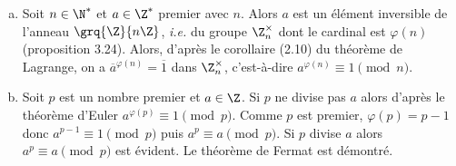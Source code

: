 \begin{enumerate}[a)]
  \item Soit $n\in\N^*$ et $a\in\Z^*$ premier avec $n$. Alors $a$ est un élément inversible de l'anneau $\grq{\Z}{n\Z}$, \textit{i.e.} du groupe $\Z^\times_n$ dont le cardinal est $\varphi(n)$ (proposition 3.24). Alors, d'après le corollaire (2.10) du théorème de Lagrange, on a $\overline{a}^{\varphi(n)}=\overline{1}$
    dans $\Z^\times_n$, c'est-à-dire $a^{\varphi(n)}\equiv 1\pmod{n}$.
  
  \item Soit $p$ est un nombre premier et $a\in\Z$. Si $p$ ne divise pas $a$
    alors d'après le théorème d'Euler $a^{\varphi(p)}\equiv 1\pmod{p}$.  Comme
    $p$ est premier, $\varphi(p)=p-1$ donc $a^{p-1}\equiv 1\pmod{p}$ puis
    $a^p\equiv a\pmod{p}$. Si $p$ divise $a$ alors $a^p\equiv a\pmod{p}$ est
    évident. Le théorème de Fermat est démontré.
\end{enumerate}


